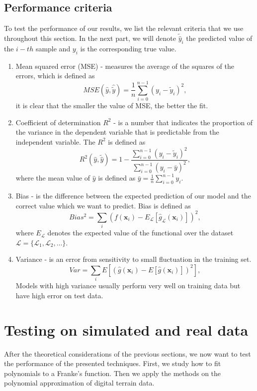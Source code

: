 \documentclass [11pt]{article}
\begin{document}
\subsection{Performance criteria}
To test the performance of our results, we list the relevant criteria that we use throughout this section. In the next part, we will denote $\tilde{\hat{y}}_i$  the predicted value of the $i-th$ sample and $y_i$ is the corresponding true value.\\
\begin{enumerate}
\item Mean squared error (MSE) - measures the average of the squares of the errors, which is defined as
\begin{equation}
MSE(\hat{y},\hat{\tilde{y}}) = \frac{1}{n}
\sum_{i=0}^{n-1}(y_i-\tilde{y}_i)^2,
\end{equation}
it is clear that the smaller the value of MSE, the better the fit.
\item Coefficient of determination $R^{2}$ - is a number that indicates the proportion of the variance in the dependent variable that is predictable from the independent variable. The $R^2$ is defined as
\begin{equation}
R^2(\hat{y}, \tilde{\hat{y}}) = 1 - \frac{\sum_{i=0}^{n - 1} (y_i - \tilde{y}_i)^2}{\sum_{i=0}^{n - 1} (y_i - \bar{y})^2},
\end{equation}
where the mean value  of $\hat{y}$ is defined as $\bar{y} =  \frac{1}{n} \sum_{i=0}^{n - 1} y_i$.
\item Bias - is the difference between the expected prediction of our model and the correct value which we want to predict. Bias is defined as
\begin{equation}
Bias^2= \sum_i (f(\boldsymbol{x}_i)-E_\mathcal{L}[\hat{g}_\mathcal{L}(\boldsymbol{x}_i)])^2,
\end{equation}
where $E_{\mathcal{L}}$ denotes the expected value of the functional over the dataset $\mathcal{L}=\{\mathcal{L}_1,
\mathcal{L}_2, \ldots \}$.
\item Variance - is an error from sensitivity to small fluctuation in the training set.
\begin{equation}
Var=\sum_i E[( \hat{g}(\boldsymbol{x}_i)-E[\hat{g}(\boldsymbol{x}_i)])^2],
\end{equation}
Models with high variance usually perform very well on training data but have high error on test data.
\end{enumerate}
\section{Testing on simulated and real data}
After the theoretical considerations of the previous sections, we now want to test the performance of the presented techniques. First, we study how to fit polynomials to a Franke's function. Then we apply the methods on the polynomial approximation of digital terrain data.
\end{document}
